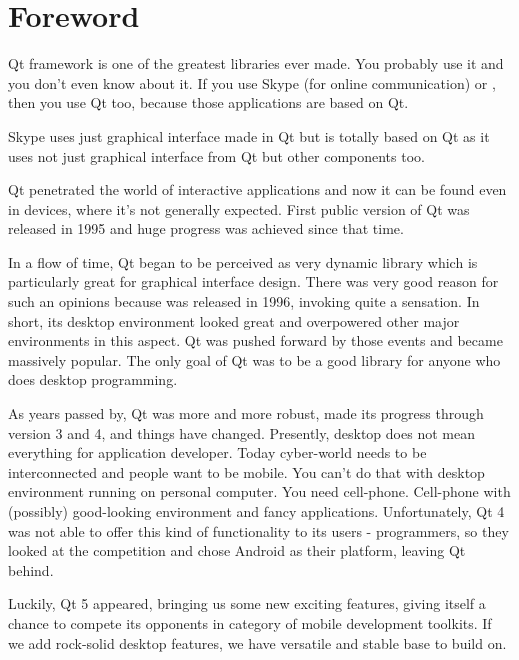 \chapter{Foreword}
Qt framework is one of the greatest libraries ever made. You probably use it and you don't even know about it. If you use Skype (for online communication) or , then you use Qt too, because those applications are based on Qt.

Skype uses just graphical interface made in Qt but  is totally based on Qt as it uses not just graphical interface from Qt but other components too.

Qt penetrated the world of interactive applications and now it can be found even in devices, where it's not generally expected. First public version of Qt was released in 1995 and huge progress was achieved since that time.

In a flow of time, Qt began to be perceived as very dynamic library which is particularly great for graphical interface design. There was very good reason for such an opinions because  was released in 1996, invoking quite a sensation. In short, its desktop environment looked great and overpowered other major environments in this aspect. Qt was pushed forward by those events and became massively popular. The only goal of Qt was to be a good library for anyone who does desktop programming.

As years passed by, Qt was more and more robust,  made its progress through version 3 and 4, and things have changed. Presently, desktop does not mean everything for application developer. Today cyber-world needs to be interconnected and people want to be mobile. You can't do that with desktop environment running on personal computer. You need cell-phone. Cell-phone with (possibly) good-looking environment and fancy applications. Unfortunately, Qt 4 was not able to offer this kind of functionality to its users - programmers, so they looked at the competition and chose Android as their platform, leaving Qt behind.

Luckily, Qt 5 appeared, bringing us some new exciting features, giving itself a chance to compete its opponents in category of mobile development toolkits. If we add rock-solid desktop features, we have versatile and stable base to build on.

\vfill

